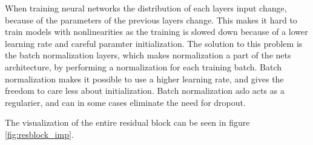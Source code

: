 When training neural networks the distribution of each layers input change, because of the parameters of the previous layers change\citep{BATCH}. This makes it hard to train models with nonlinearities as the training is slowed down because of a lower learning rate and careful paramter initialization. The solution to this problem is the batch normalization layers, which makes normalization a part of the nets architecture, by performing a normalization for each training batch. Batch normalization makes it possible to use a higher learning rate, and gives the freedom to care less about initialization. Batch normalization aslo acts as a regularier, and can in some cases eliminate the need for dropout. 

The visualization of the entire residual block can be seen in figure \ref{fig:resblock_imp}.


